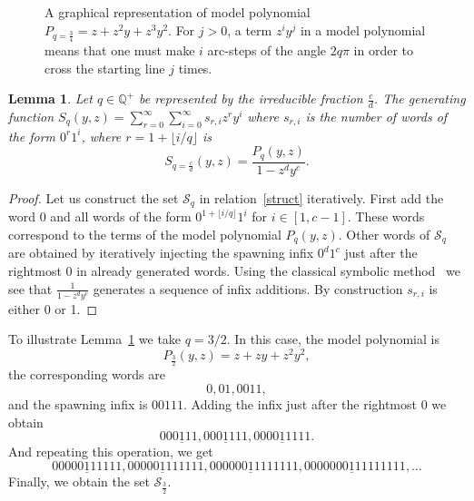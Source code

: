 \documentclass[a4paper,12pt]{article}
\newtheorem{lemma}{Lemma}
\theoremstyle{definition}
\newcommand{\Q}{\mathbb{Q}}
\def\S{\mathcal{S}}
\begin{document}
\begin{figure}[ht]
  \caption{A graphical representation of model polynomial
    $P_{q=\frac{3}{4}} = z + z^2 y + z^3 y^2$. For $j>0$, a term
    $z^iy^j$ in a model polynomial means that one must make $i$
    arc-steps of the angle $2q\pi$ in order to cross the starting line
    $j$ times.  }
  \label{gr}
\end{figure}


\begin{lemma}
  Let $q \in \Q^+$ be represented by the irreducible fraction
  $\frac{c}{d}$.  The generating function $S_q(y,z) =
  \sum_{r=0}^\infty \sum_{i=0}^\infty s_{r,i} z^r y^i$ where $s_{r,i}$
  is the number of words of the form $0^r1^i$,
  where $r = {1+\lfloor i/q \rfloor}$ is
  $$S_{q=\frac{c}{d}}(y,z) = \frac{P_q(y,z)}{1-z^dy^c}.$$
  \label{l1}
\end{lemma}

\begin{proof}
  Let us construct the set $\S_q$ in relation~\eqref{struct}
  iteratively.  First add the word $0$ and all words of the form
  $0^{1+\lfloor i/q \rfloor}1^i$ for $i \in [1,c-1]$.  These words
  correspond to the terms of the model polynomial $P_q(y,z)$. Other
  words of $\S_q$ are obtained by iteratively injecting the spawning
  infix $0^d1^c$ just after the rightmost 0 in already generated
  words.  Using the classical symbolic method~\cite{fla} we see that
  $\frac{1}{{1-z^dy^c}}$ generates a sequence of infix additions. By
  construction $s_{r,i}$ is either 0 or 1.
\end{proof}

To illustrate Lemma~\ref{l1} we take $q=3/2$.  In this case, the model
polynomial is $$P_{\frac{3}{2}} (y,z) = z + zy + z^2y^2, $$
the corresponding words are
$$0, 01, 0011,$$ and the spawning infix is $00111$.  Adding the infix
just after the rightmost 0 we obtain
$$0\underline{00111}, 0\underline{00111}1, 00\underline{00111}11.$$
And repeating this operation, we get
$$000\underline{00111}111, 000\underline{00111}1111, 0000\underline{00111}11111,
00000\underline{00111}111111, \ldots$$
Finally, we obtain the set $\S_{\frac{3}{2}}$.
\end{document}
